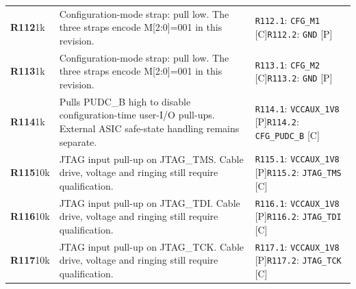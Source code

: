 \documentclass[11pt,a4paper]{article}
\begin{document}
\begin{longtable}{@{}P{27mm}P{83mm}P{58mm}@{}}
\textbf{R112}\newline 1k & Configuration-mode strap: pull low. The three straps encode M[2:0]=001 in this revision. & \nolinkurl{R112.1}: \nolinkurl{CFG_M1} [C]\newline \nolinkurl{R112.2}: \nolinkurl{GND} [P] \\
\textbf{R113}\newline 1k & Configuration-mode strap: pull low. The three straps encode M[2:0]=001 in this revision. & \nolinkurl{R113.1}: \nolinkurl{CFG_M2} [C]\newline \nolinkurl{R113.2}: \nolinkurl{GND} [P] \\
\textbf{R114}\newline 1k & Pulls PUDC\_B high to disable configuration-time user-I/O pull-ups. External ASIC safe-state handling remains separate. & \nolinkurl{R114.1}: \nolinkurl{VCCAUX_1V8} [P]\newline \nolinkurl{R114.2}: \nolinkurl{CFG_PUDC_B} [C] \\
\textbf{R115}\newline 10k & JTAG input pull-up on JTAG\_TMS. Cable drive, voltage and ringing still require qualification. & \nolinkurl{R115.1}: \nolinkurl{VCCAUX_1V8} [P]\newline \nolinkurl{R115.2}: \nolinkurl{JTAG_TMS} [C] \\
\textbf{R116}\newline 10k & JTAG input pull-up on JTAG\_TDI. Cable drive, voltage and ringing still require qualification. & \nolinkurl{R116.1}: \nolinkurl{VCCAUX_1V8} [P]\newline \nolinkurl{R116.2}: \nolinkurl{JTAG_TDI} [C] \\
\textbf{R117}\newline 10k & JTAG input pull-up on JTAG\_TCK. Cable drive, voltage and ringing still require qualification. & \nolinkurl{R117.1}: \nolinkurl{VCCAUX_1V8} [P]\newline \nolinkurl{R117.2}: \nolinkurl{JTAG_TCK} [C] \\

\end{longtable}
\end{document}
